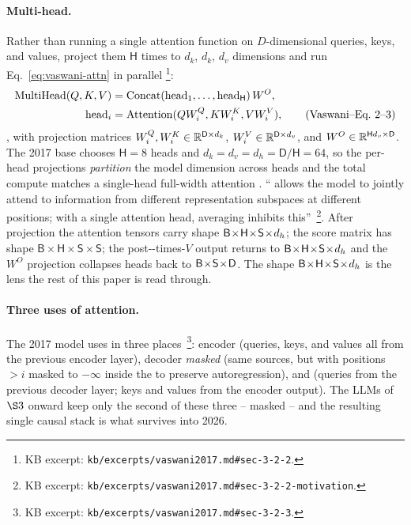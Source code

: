 \paragraph{Multi-head.} Rather than running a single attention
function on $D$-dimensional queries, keys, and values,
\citet{vaswani2017} project them $\mathsf{H}$ times to $d_k$, $d_k$,
$d_v$ dimensions and run Eq.~\eqref{eq:vaswani-attn} in
parallel%
\footnote{KB excerpt: \texttt{kb/excerpts/vaswani2017.md\#sec-3-2-2}.}:
\begin{align}
  \mathrm{MultiHead}(Q, K, V)
   &= \mathrm{Concat}(\mathrm{head}_1, \ldots, \mathrm{head}_{\mathsf{H}})\, W^O,
   \notag \\
  \mathrm{head}_i
   &= \mathrm{Attention}(Q W_i^Q, K W_i^K, V W_i^V),
   \tag{Vaswani--Eq.~2--3}
  \label{eq:vaswani-multihead}
\end{align}
\citep[\S 3.2.2, Eq.~2--3]{vaswani2017}, with projection matrices
$W_i^Q, W_i^K \in \mathbb{R}^{\mathsf{D} \times d_k}$,
$W_i^V \in \mathbb{R}^{\mathsf{D} \times d_v}$, and
$W^O \in \mathbb{R}^{\mathsf{H} d_v \times \mathsf{D}}$. The 2017 base
chooses $\mathsf{H} = 8$ heads and
$d_k = d_v = d_h = \mathsf{D}/\mathsf{H} = 64$, so the per-head
projections \emph{partition} the model dimension across heads and
the total compute matches a single-head full-width attention
\citep[\S 3.2.2]{vaswani2017}. `` allows the
model to jointly attend to information from different
representation subspaces at different positions; with a single
attention head, averaging inhibits this''~\citep[\S
3.2.2]{vaswani2017}\footnote{KB excerpt: \texttt{kb/excerpts/vaswani2017.md\#sec-3-2-2-motivation}.}.
After projection the attention tensors carry shape $\mathsf{B}\!\times\!\mathsf{H}\!\times\!\mathsf{S}\!\times\!d_h$; the
score matrix has shape
$\mathsf{B}\!\times\!\mathsf{H}\!\times\!\mathsf{S}\!\times\!\mathsf{S}$;
the post--times-$V$ output returns to $\mathsf{B}\!\times\!\mathsf{H}\!\times\!\mathsf{S}\!\times\!d_h$ and the
$W^O$ projection collapses heads back to $\mathsf{B}\!\times\!\mathsf{S}\!\times\!\mathsf{D}$. The shape
$\mathsf{B}\!\times\!\mathsf{H}\!\times\!\mathsf{S}\!\times\!d_h$ is the lens the rest of this paper is read through.

\paragraph{Three uses of attention.} The 2017 model uses
 in three places~\citep[\S
3.2.3]{vaswani2017}\footnote{KB excerpt: \texttt{kb/excerpts/vaswani2017.md\#sec-3-2-3}.}:
encoder  (queries, keys, and values all from the
previous encoder layer), decoder \emph{masked}  (same
sources, but with positions $> i$ masked to $-\infty$ inside the
 to preserve autoregression), and 
 (queries from the previous decoder layer; keys and
values from the encoder output). The  LLMs of $\S 3$
onward keep only the second of these three -- masked 
-- and the resulting single causal stack is what survives into
2026.

